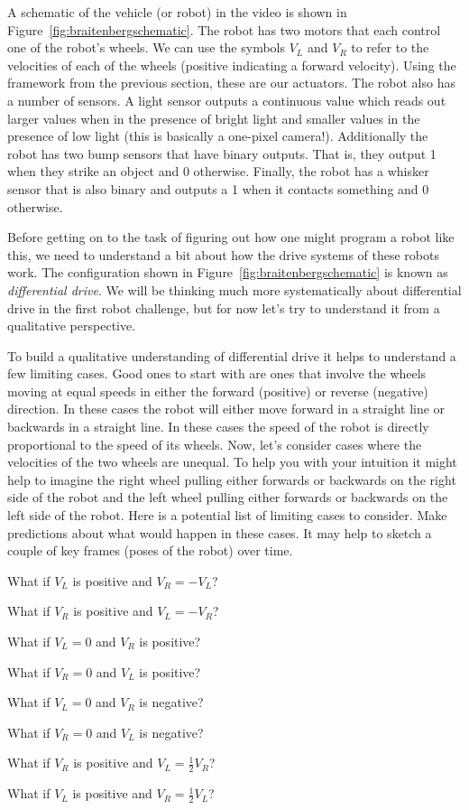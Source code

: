 \documentclass{tufte-handout}
\begin{document}
A schematic of the vehicle (or robot) in the video is shown in Figure~\ref{fig:braitenbergschematic}.  The robot has two motors that each control one of the robot's wheels.  We can use the symbols $V_L$ and $V_R$ to refer to the velocities of each of the wheels (positive indicating a forward velocity).  Using the framework from the previous section, these are our actuators.  The robot also has a number of sensors.  A light sensor outputs a continuous value which reads out larger values when in the presence of bright light and smaller values in the presence of low light (this is basically a one-pixel camera!).  Additionally the robot has two bump sensors that have binary outputs.  That is, they output 1 when they strike an object and 0 otherwise.  Finally, the robot has a whisker sensor that is also binary and outputs a 1 when it contacts something and 0 otherwise.

Before getting on to the task of figuring out how one might program a robot like this, we need to understand a bit about how the drive systems of these robots work.  The configuration shown in Figure~\ref{fig:braitenbergschematic} is known as \emph{differential drive}.  We will be thinking much more systematically about differential drive in the first robot challenge, but for now let's try to understand it from a qualitative perspective.

\be[resume=exercises, label=\textbf{Exercise} (\arabic*)]
\item To build a qualitative understanding of differential drive it helps to understand a few limiting cases.  Good ones to start with are ones that involve the wheels moving at equal speeds in either the forward (positive) or reverse (negative) direction.  In these cases the robot will either move forward in a straight line or backwards in a straight line.  In these cases the speed of the robot is directly proportional to the speed of its wheels.  Now, let's consider cases where the velocities of the two wheels are unequal.  To help you with your intuition it might help to imagine the right wheel pulling either forwards or backwards on the right side of the robot and the left wheel pulling either forwards or backwards on the left side of the robot.  Here is a potential list of limiting cases to consider.  Make predictions about what would happen in these cases.  It may help to sketch a couple of key frames (poses of the robot) over time.
\be
\item What if $V_L$ is positive and $V_R = -V_L$?
\item What if $V_R$ is positive and $V_L = -V_R$?
\item What if $V_L = 0$ and $V_R$ is positive?
\item What if $V_R = 0$ and $V_L$ is positive?
\item What if $V_L = 0$ and $V_R$ is negative?
\item What if $V_R = 0$ and $V_L$ is negative?
\item What if $V_R$ is positive and $V_L = \frac{1}{2}V_R$?
\item What if $V_L$ is positive and $V_R = \frac{1}{2}V_L$?
\ee
\ee
\end{document}
